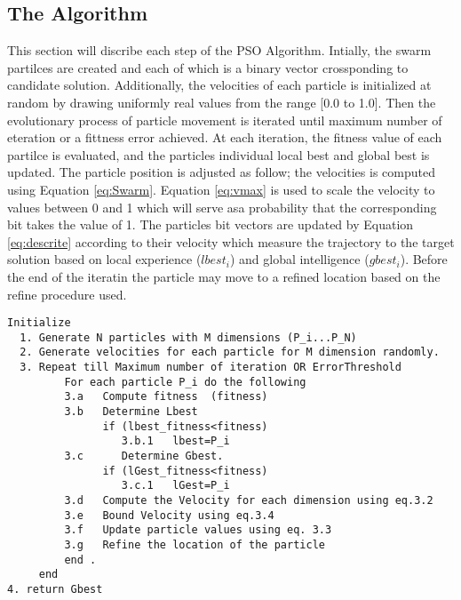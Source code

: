 \subsection{The Algorithm}
\label{sec:ParticleSwarmAlgorithm} 

This section will discribe each step of the PSO Algorithm. Intially, the swarm partilces are created and each of which is a binary vector crossponding to candidate solution. Additionally, the velocities of each particle is initialized at random by drawing uniformly real values from the range [0.0 to 1.0]. Then the evolutionary process of particle movement is iterated until maximum number of eteration or a fittness error achieved. At each iteration,  the fitness value of each partilce is evaluated, and the particles individual local best and global best is updated. The particle position is adjusted as follow; the velocities is computed using Equation \ref{eq:Swarm}. Equation \ref{eq:vmax} is used to scale the velocity to values between 0 and 1 which will serve asa probability that the corresponding bit takes the value of 1. The particles bit vectors are updated by Equation \ref{eq:descrite} according to their velocity which measure the trajectory to the target solution based on local experience ($lbest_{i}$) and global intelligence ($gbest_{i}$). Before the end of the iteratin the particle may move to a refined location based on the refine procedure used. 

\begin{verbatim}
Initialize 
  1. Generate N particles with M dimensions (P_i...P_N) 
  2. Generate velocities for each particle for M dimension randomly. 
  3. Repeat till Maximum number of iteration OR ErrorThreshold  
         For each particle P_i do the following 
         3.a   Compute fitness  (fitness)
         3.b   Determine Lbest  
               if (lbest_fitness<fitness)
                  3.b.1   lbest=P_i
         3.c      Determine Gbest.
               if (lGest_fitness<fitness)
                  3.c.1   lGest=P_i
         3.d   Compute the Velocity for each dimension using eq.3.2 
         3.e   Bound Velocity using eq.3.4
         3.f   Update particle values using eq. 3.3
         3.g   Refine the location of the particle
         end .
     end 
4. return Gbest
\end{verbatim}
  
  
